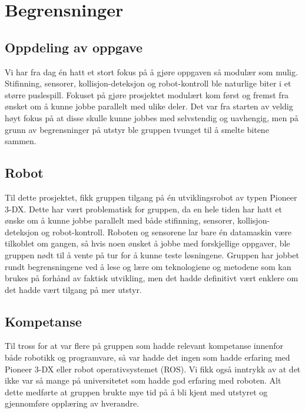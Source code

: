 \section{Begrensninger}

\subsection{Oppdeling av oppgave}
Vi har fra dag én hatt et stort fokus på å gjøre oppgaven så modulær som mulig. Stifinning, sensorer, kollisjon-deteksjon og robot-kontroll ble naturlige biter i et større puslespill. Fokuset på gjøre prosjektet modulært kom først og fremst fra ønsket om å kunne jobbe parallelt med ulike deler. Det var fra starten av veldig høyt fokus på at disse skulle kunne jobbes med selvstendig og uavhengig, men på grunn av begrensninger på utstyr ble gruppen tvunget til å smelte bitene sammen.

\subsection{Robot}
Til dette prosjektet, fikk gruppen tilgang på én utviklingsrobot av typen Pioneer 3-DX. Dette har vært problematisk for gruppen, da en hele tiden har hatt et ønske om å kunne jobbe parallelt med både stifinning, sensorer, kollisjon-deteksjon og robot-kontroll. Roboten og sensorene lar bare én datamaskin være tilkoblet om gangen, så hvis noen ønsket å jobbe med forskjellige oppgaver, ble gruppen nødt til å vente på tur for å kunne teste løsningene. Gruppen har jobbet rundt begrensningene ved å lese og lære om teknologiene og metodene som kan brukes på forhånd av faktisk utvikling, men det hadde definitivt vært enklere om det hadde vært tilgang på mer utstyr.

\subsection{Kompetanse}
Til tross for at var flere på gruppen som hadde relevant kompetanse innenfor både robotikk og programvare, så var hadde det ingen som hadde erfaring med Pioneer 3-DX eller robot operativsystemet (ROS). Vi fikk også inntrykk av at det ikke var så mange på universitetet som hadde god erfaring med roboten. Alt dette medførte at gruppen brukte mye tid på å bli kjent med utstyret og gjennomføre opplæring av hverandre. 

